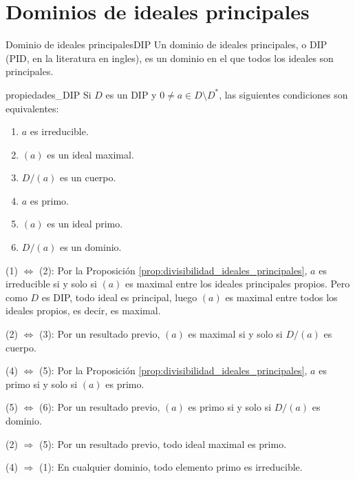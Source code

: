 \clearpage
\section{Dominios de ideales principales}

\begin{definition}{Dominio de ideales principales}{DIP}
Un dominio de ideales principales, o DIP (PID, en la literatura en ingles), es un dominio en el que todos los ideales son principales.
\end{definition}

\begin{proposition}{}{propiedades_DIP}
Si \(D\) es un DIP y \(0 \neq a \in D \setminus D^*\), las siguientes condiciones son equivalentes:

\begin{enumerate}
\item \(a\) es irreducible.

\item \((a)\) es un ideal maximal.

\item \(D/(a)\) es un cuerpo.

\item \(a\) es primo.

\item \((a)\) es un ideal primo.

\item \(D/(a)\) es un dominio.
\end{enumerate}

\end{proposition}

\begin{proofbox}

(1) \(\Leftrightarrow\) (2): Por la Proposición \ref{prop:divisibilidad_ideales_principales}, \(a\) es irreducible si y solo si \((a)\) es maximal entre los ideales principales propios. Pero como \(D\) es DIP, todo ideal es principal, luego \((a)\) es maximal entre todos los ideales propios, es decir, es maximal.

(2) \(\Leftrightarrow\) (3): Por un resultado previo, \((a)\) es maximal si y solo si \(D/(a)\) es cuerpo.

(4) \(\Leftrightarrow\) (5): Por la Proposición \ref{prop:divisibilidad_ideales_principales}, \(a\) es primo si y solo si \((a)\) es primo.

(5) \(\Leftrightarrow\) (6): Por un resultado previo, \((a)\) es primo si y solo si \(D/(a)\) es dominio.

(2) \(\Rightarrow\) (5): Por un resultado previo, todo ideal maximal es primo.

(4) \(\Rightarrow\) (1): En cualquier dominio, todo elemento primo es irreducible.
\end{proofbox}


